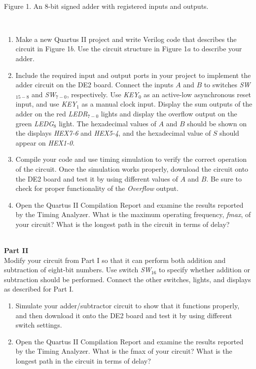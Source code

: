 \documentclass[psfig,10pt,fullpage]{article}
\begin{document}
\begin{figure}[H]
\scriptsize
\centerline{
\hbox{}}
\end{figure}
~\\
\centerline{Figure 1.  An 8-bit signed adder with registered inputs and outputs.}
~\\
\begin{enumerate}
\item Make a new Quartus II project and write Verilog code that describes the circuit in
Figure 1$b$. Use the circuit structure in Figure 1$a$ to describe your adder.
\item Include the required input and output ports in your project to implement the adder
circuit on the DE2 board. Connect the inputs $A$ and $B$ to switches {\it SW}$_{15-8}$ and 
{\it SW}$_{7-0}$, respectively. Use {\it KEY}$_0$ as an active-low asynchronous reset
input, and use {\it KEY}$_1$ as a manual clock input. Display the sum outputs of the adder
on the red {\it LEDR}$_{7-0}$ lights and display the overflow output on the green 
{\it LEDG}$_8$ light. The hexadecimal values of $A$ and $B$ should be shown on the 
displays {\it HEX7-6} and {\it HEX5-4}, and the hexadecimal value of $S$ should appear on
{\it HEX1-0}.
\item Compile your code and use timing simulation to verify the correct operation of
the circuit. Once the simulation works properly, download the circuit onto the DE2 board
and test it by using different values of $A$ and $B$. Be sure to check for proper
functionality of the {\it Overflow} output.
\item Open the Quartus II Compilation Report and examine the results reported by the
Timing Analyzer. What is the maximum operating frequency, {\it fmax}, of your circuit? What is
the longest path in the circuit in terms of delay?
\end{enumerate}

~\\
\noindent
{\bf Part II}
~\\

\noindent
Modify your circuit from Part I so that it can perform both addition and subtraction of
eight-bit numbers. Use switch {\it SW}$_{16}$ to specify whether addition or subtraction
should be performed. Connect the other switches, lights, and displays as described for
Part I.

\begin{enumerate}
\item Simulate your adder/subtractor circuit to show that it functions properly, and then
download it onto the DE2 board and test it by using different switch settings.
\item Open the Quartus II Compilation Report and examine the results reported by the
Timing Analyzer. What is the fmax of your circuit? What is
the longest path in the circuit in terms of delay?
\end{enumerate}
\end{document}
